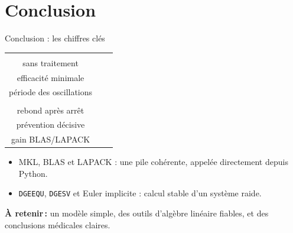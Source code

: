\documentclass[aspectratio=169,11pt,t]{beamer}
\newcommand{\Rzero}{\mathcal{R}_0}
\newcommand{\takeaway}[1]{\vfill\noindent{\color{gold}\vrule width 3pt}\colorbox{lightbg}{\parbox[c]{\dimexpr\textwidth-3pt-2\fboxsep\relax}{\vphantom{Ég}\small\textbf{\color{navy}À retenir\,:} #1\vphantom{Ég}}}\par}
\newcommand{\kpi}[2]{%
    \begin{tikzpicture}\node[draw=navy,line width=0.8pt,rounded corners=3pt,fill=white,minimum width=3.3cm,minimum height=1.45cm,text width=3.0cm,align=center,inner sep=3pt]
    {{\color{navy}\Large\bfseries #1}\\[-1pt]{\scriptsize\color{mid} #2}};\end{tikzpicture}}
\begin{document}
\section*{Conclusion}

\begin{frame}{Conclusion : les chiffres clés}
    \vspace{0.2cm}
    \centering
    \begin{tabular}{c c c}
        \kpi{$\Rzero=4$}{sans traitement} & \kpi{$\eta_c=75\,\%$}{efficacité minimale} & \kpi{$\approx53$ j}{période des oscillations}\\[8pt]
        \kpi{$\times18$}{rebond après arrêt} & \kpi{$\Rzero^{\mathrm{pop}}=1{,}8$}{prévention décisive} & \kpi{$\times10^{3}$}{gain BLAS/LAPACK}\\
    \end{tabular}
    \vspace{0.3cm}

    \raggedright\small
    \begin{itemize}
        \item MKL, BLAS et LAPACK : une pile cohérente, appelée directement depuis Python.
        \item \texttt{DGEEQU}, \texttt{DGESV} et Euler implicite : calcul stable d'un système raide.
    \end{itemize}
    \takeaway{un modèle simple, des outils d'algèbre linéaire fiables, et des conclusions médicales claires.}
\end{frame}
\end{document}
